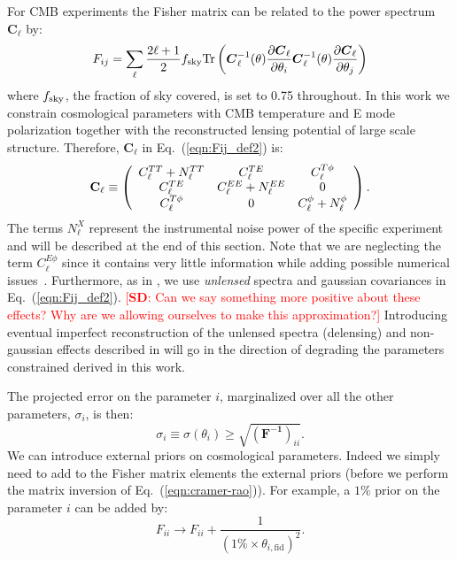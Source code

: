 \documentclass[aps,prd,reprint,superscriptaddress]{revtex4-1}
\newcommand{\sd}[1]{\textcolor{red}{[{\bf SD}: #1]}}
\newcommand\refeq[1]{Eq.~(\ref{eqn:#1})}
\begin{document}
For CMB experiments the Fisher matrix can be related to the power spectrum $\boldsymbol{C}_\ell$ by:
\begin{equation}
 F_{ij} = \sum_\ell \frac{2\ell+1}{2} f_{\rm sky} {\rm Tr} \left(  \boldsymbol{C}^{-1}_\ell( \theta) \frac{\partial \boldsymbol{C}_\ell}{\partial \theta_i} \boldsymbol{C}^{-1}_\ell( \theta) \frac{\partial \boldsymbol{C}_\ell}{\partial \theta_j}  \right)
 \label{eqn:Fij_def2}
 \end{equation}
 where $f_{\rm sky}$, the fraction of sky covered, is set to 0.75 throughout.
In this work we constrain cosmological parameters with CMB temperature and E mode polarization together with the reconstructed lensing potential of large scale structure. Therefore, $\boldsymbol{C}_\ell$ in \refeq{Fij_def2} is:
 \begin{eqnarray}
 	\centering
		\mathbf{C}_\ell \equiv \left( \begin{array}{ccc}C_\ell^{TT} + N_\ell^{TT} & C_\ell^{TE} & C_\ell^{T\phi} \\ C_\ell^{TE} & C_\ell^{EE} + N_\ell^{EE} & 0 \\ C_\ell^{T\phi} & 0 & C_\ell^{\phi} + N_\ell^{\phi}\end{array}\right).
	\label{eqn:cov_definition}
\end{eqnarray}
The terms $N_\ell^{X}$ represent the instrumental noise power of the specific experiment and will be described at the end of this section.
Note that we are neglecting the term $C_\ell^{E\phi}$ since it  contains very little information while adding possible numerical issues~\cite{wu:2014,2013PhRvD..87h3008H}.
Furthermore, as in \cite{wu:2014}, we use \textit{unlensed} spectra and gaussian covariances in \refeq{Fij_def2}. \sd{Can we say something more positive about these effects? Why are we allowing ourselves to make this approximation?} Introducing eventual imperfect reconstruction of the unlensed spectra (delensing) and non-gaussian effects described in \cite{benoit-levy:2012} will go in the direction of degrading the parameters constrained derived in this work.

The projected error on the parameter $i$, marginalized over all the other parameters, $\sigma_i$, is then:
\begin{equation}
\sigma_i \equiv \sigma (\theta_i) \geq \sqrt{(\mathbf{ F^{-1}})_{ii}}.
\label{eqn:cramer-rao}
\end{equation}
We can introduce external priors on cosmological parameters.
Indeed we simply need to add to the Fisher matrix elements the external priors (before we perform the matrix inversion of \refeq{cramer-rao}).
For example, a $1\%$ prior on the parameter $i$ can be added by:
\begin{equation}
F_{ii} \rightarrow F_{ii} + \frac{1}{(1\% \times  \theta_{i,\text{fid}})^2}.
\end{equation}
\end{document}
